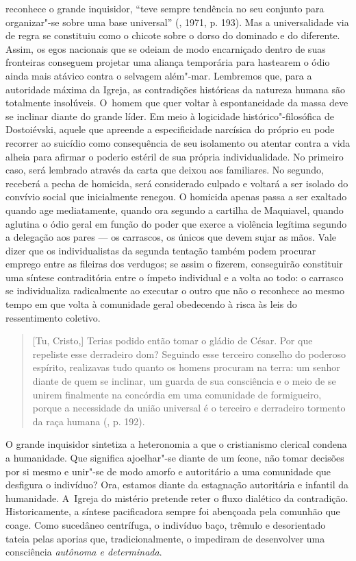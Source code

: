 reconhece o grande inquisidor, ``teve sempre tendência no seu conjunto
para organizar"-se sobre uma base universal'' (, 1971, p.
193). Mas a universalidade via de regra se constituiu como o chicote
sobre o dorso do dominado e do diferente. Assim, os egos nacionais que
se odeiam de modo encarniçado dentro de suas fronteiras conseguem
projetar uma aliança temporária para hastearem o ódio ainda mais atávico
contra o selvagem além"-mar. Lembremos que, para a autoridade máxima da
Igreja, as contradições históricas da natureza humana são totalmente
insolúveis. O~homem que quer voltar à espontaneidade da massa deve se
inclinar diante do grande líder. Em meio à logicidade
histórico"-filosófica de Dostoiévski, aquele que apreende a
especificidade narcísica do próprio eu pode recorrer ao suicídio como
consequência de seu isolamento ou atentar contra a vida alheia para
afirmar o poderio estéril de sua própria individualidade. No primeiro
caso, será lembrado através da carta que deixou aos familiares. No
segundo, receberá a pecha de homicida, será considerado culpado e
voltará a ser isolado do convívio social que inicialmente renegou. O
homicida apenas passa a ser exaltado quando age mediatamente, quando ora
segundo a cartilha de Maquiavel, quando aglutina o ódio geral em função
do poder que exerce a violência legítima segundo a delegação aos pares
--- os carrascos, os únicos que devem sujar as mãos. Vale dizer que os
individualistas da segunda tentação também podem procurar emprego entre
as fileiras dos verdugos; se assim o fizerem, conseguirão constituir uma
síntese contraditória entre o ímpeto individual e a volta ao todo: o
carrasco se individualiza radicalmente ao executar o outro que não o
reconhece ao mesmo tempo em que volta à comunidade geral obedecendo à
risca às leis do ressentimento coletivo.

\begin{quote}
{[}Tu, Cristo,{]} Terias podido então tomar o gládio de César. Por que
repeliste esse derradeiro dom? Seguindo esse terceiro conselho do
poderoso espírito, realizavas tudo quanto os homens procuram na terra:
um senhor diante de quem se inclinar, um guarda de sua consciência e o
meio de se unirem finalmente na concórdia em uma comunidade de
formigueiro, porque a necessidade da união universal é o terceiro e
derradeiro tormento da raça humana (, p. 192).
\end{quote}

O grande inquisidor sintetiza a heteronomia a que o cristianismo
clerical condena a humanidade. Que significa ajoelhar"-se diante de um
ícone, não tomar decisões por si mesmo e unir"-se de modo amorfo e
autoritário a uma comunidade que desfigura o indivíduo? Ora, estamos
diante da estagnação autoritária e infantil da humanidade. A~Igreja do
mistério pretende reter o fluxo dialético da contradição.
Historicamente, a síntese pacificadora sempre foi abençoada pela
comunhão que coage. Como sucedâneo centrífuga, o indivíduo baço, trêmulo
e desorientado tateia pelas aporias que, tradicionalmente, o impediram
de desenvolver uma consciência \emph{autônoma e determinada}.

